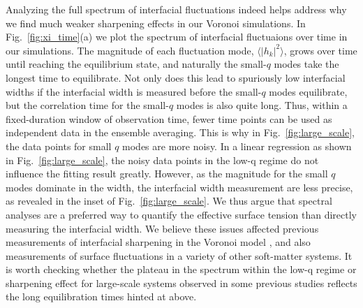 \documentclass[twoside,twocolumn,9pt]{article}
\begin{document}
Analyzing the full spectrum of interfacial fluctuations indeed helps address why we find much weaker sharpening effects in our Voronoi simulations. In Fig.~\ref{fig:xi_time}(a) we plot the spectrum of interfacial fluctuaions over time in our simulations. The magnitude of each fluctuation mode, $\langle|h_k|^2\rangle$, grows over time until reaching the equilibrium state, and naturally the small-$q$ modes take the longest time to equilibrate. Not only does this lead to spuriously low interfacial widths if the interfacial width is measured before the small-$q$ modes equilibrate, but the correlation time for the small-$q$ modes is also quite long. Thus, within a fixed-duration window of observation time, fewer time points can be used as independent data in the ensemble averaging. This is why in Fig.~\ref{fig:large_scale}, the data points for small $q$ modes are more noisy. In a linear regression as shown in Fig.~\ref{fig:large_scale}, the noisy data points in the low-q regime  do not influence the fitting result greatly. However, as the magnitude for the small $q$ modes dominate in the width, the interfacial width measurement are less precise, as revealed in the inset of Fig.~\ref{fig:large_scale}. We thus argue that spectral analyses are a preferred way to quantify the effective surface tension than directly measuring the interfacial width. We believe these issues affected previous measurements of interfacial sharpening in the Voronoi model \cite{sussman2018soft}, and also measurements of surface fluctuations in a variety of other soft-matter systems. It is worth checking whether the plateau in the spectrum within the low-q regime or sharpening effect for large-scale systems observed  in some previous studies reflects the long equilibration times hinted at above\cite{martinez2022morphological,del2019interface}.  
\end{document}
